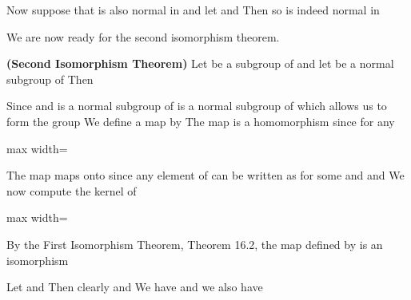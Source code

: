 \documentclass[11pt,oneside]{article}
\begin{document}
\begin{BookBody}
Now suppose that  is also normal in  and let  and  Then  so  is indeed normal in \BookEnd{\blacklozenge}

We are now ready for the second isomorphism theorem.

 \textbf{(Second Isomorphism Theorem)} Let  be a subgroup of  and let  be a normal subgroup of  Then 

 Since  and  is a normal subgroup of  is a normal subgroup of  which allows us to form the group  We define a map  by  The map \BookInline{\phi } is a homomorphism since for any 

\begin{center}\begin{adjustbox}{max width=\linewidth}\end{adjustbox}\end{center}

\noindent The map \BookInline{\phi } maps onto  since any element of  can be written as  for some  and  and  We now compute the kernel of 

\begin{center}\begin{adjustbox}{max width=\linewidth}\end{adjustbox}\end{center}

\noindent By the First Isomorphism Theorem, Theorem 16.2, the map  defined by  is an isomorphism\BookEnd{\blacklozenge}

 Let  and  Then clearly   and  We have  and we also have \BookEnd{\blacktriangle}


\end{BookBody}
\end{document}
